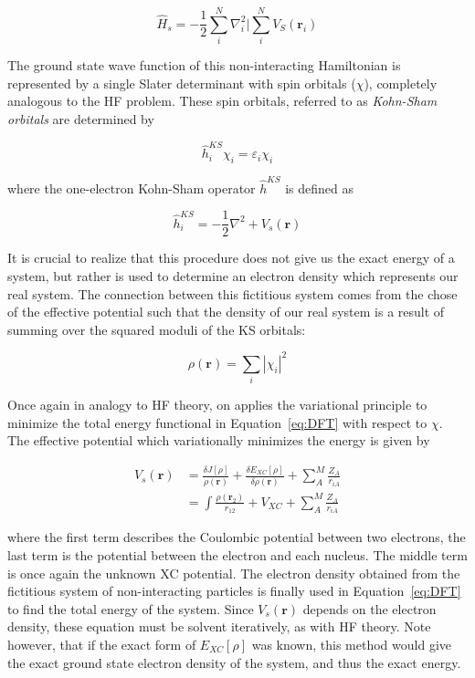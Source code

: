 \begin{equation}
  \hat{H}_s = -\frac{1}{2}\sum_i^N\nabla_i^2 | \sum_i^N V_S(\mathbf{r}_i)
\end{equation}

\noindent The ground state wave function of this non-interacting Hamiltonian is represented by a single Slater determinant with spin orbitals ($\chi$), completely analogous to the HF problem. These spin orbitals, referred to as \emph{Kohn-Sham orbitals} are determined by

\begin{equation}
  \hat{h}_i^{KS} \chi_i = \varepsilon_i \chi_i
  \label{eq:kohnsham}
\end{equation}

\noindent where the one-electron Kohn-Sham operator $\hat{h}^{KS}$ is defined as

\begin{equation}
  \hat{h}_i^{KS} = -\frac{1}{2}\nabla^2 + V_s(\mathbf{r})
  \label{eq:ksoperator}
\end{equation}

It is crucial to realize that this procedure does not give us the exact energy of a system, but rather is used to determine an electron density which represents our real system. The connection between this fictitious system comes from the chose of the effective potential such that the density of our real system is a result of summing over the squared moduli of the KS orbitals:

\begin{equation}
  \rho(\mathbf{r}) = \sum_i | \chi_i |^2
\end{equation}

Once again in analogy to HF theory, on applies the variational principle to minimize the total energy functional in Equation~\ref{eq:DFT} with respect to $\chi$. The effective potential which variationally minimizes the energy is given by\cite{Parr1995}

\begin{equation}
\begin{split}
  V_s(\mathbf{r}) &= \frac{\delta J[\rho]}{\rho(\mathbf{r})} + \frac{\delta E_{XC}[\rho]}{\delta \rho(\mathbf{r})} + \sum_A^M \frac{Z_A}{r_{iA}} \\
  &= \int\frac{\rho(\mathbf{r}_2)}{r_{12}} + V_{XC} + \sum_A^M \frac{Z_A}{r_{iA}}
\end{split}
\end{equation}

\noindent where the first term describes the Coulombic potential between two electrons, the last term is the potential between the electron and each nucleus. The middle term is once again the unknown XC potential. The electron density obtained from the fictitious system of non-interacting particles is finally used in Equation~\ref{eq:DFT} to find the total energy of the system. Since $V_s(\mathbf{r})$ depends on the electron density, these equation must be solvent iteratively, as with HF theory. Note however, that if the exact form of $E_{XC}[\rho]$ was known, this method would give the exact ground state electron density of the system, and thus the exact energy.

